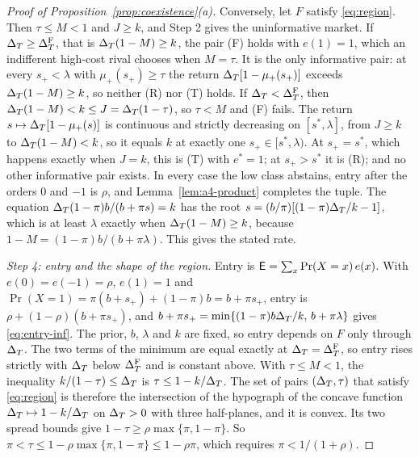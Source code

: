 \begin{proof}[Proof of Proposition~\ref{prop:coexistence}(a)]
Conversely, let \(F\) satisfy \eqref{eq:region}. Then \(\tau\le M<1\) and \(J\ge k\), and Step 2 gives the uninformative
market. If \(\Delta_T\ge\Delta_T^{\rm F}\), that is \(\Delta_T(1-M)\ge k\), the pair (F) holds with \(e(1)=1\), which an indifferent
high-cost rival chooses when \(M=\tau\). It is the only informative pair: at every \(s_+<\lambda\) with
\(\mu_+(s_+)\ge\tau\) the return \(\Delta_T[1-\mu_+(s_+)]\) exceeds \(\Delta_T(1-M)\ge k\), so neither (R) nor (T) holds. If
\(\Delta_T<\Delta_T^{\rm F}\), then \(\Delta_T(1-M)<k\le J=\Delta_T(1-\tau)\), so \(\tau<M\) and (F) fails. The return
\(s\mapsto\Delta_T[1-\mu_+(s)]\) is continuous and strictly decreasing on \([s^*,\lambda]\), from \(J\ge k\) to
\(\Delta_T(1-M)<k\), so it equals \(k\) at exactly one \(s_+\in[s^*,\lambda)\). At \(s_+=s^*\), which happens exactly when
\(J=k\), this is (T) with \(e^*=1\); at \(s_+>s^*\) it is (R); and no other informative pair exists. In every case the
low class abstains, entry after the orders \(0\) and \(-1\) is \(\rho\), and Lemma~\ref{lem:a4-product} completes the
tuple. The equation \(\Delta_T(1-\pi)b/(b+\pi s)=k\) has the root \(s=(b/\pi)[(1-\pi)\Delta_T/k-1]\), which is at least
\(\lambda\) exactly when \(\Delta_T(1-M)\ge k\), because \(1-M=(1-\pi)b/(b+\pi\lambda)\). This gives the stated rate.

\emph{Step 4: entry and the shape of the region.} Entry is \(\mathsf{E}=\sum_x\Pr(X=x)\,e(x)\). With \(e(0)=e(-1)=\rho\),
\(e(1)=1\) and \(\Pr(X=1)=\pi(b+s_+)+(1-\pi)b=b+\pi s_+\), entry is \(\rho+(1-\rho)(b+\pi s_+)\), and
\(b+\pi s_+=\min\{(1-\pi)b\Delta_T/k,\,b+\pi\lambda\}\) gives \eqref{eq:entry-inf}. The prior, \(b\), \(\lambda\) and \(k\)
are fixed, so entry depends on \(F\) only through \(\Delta_T\). The two terms of the minimum are equal exactly at
\(\Delta_T=\Delta_T^{\rm F}\), so entry rises strictly with \(\Delta_T\) below \(\Delta_T^{\rm F}\) and is constant above. With
\(\tau\le M<1\), the inequality \(k/(1-\tau)\le\Delta_T\) is \(\tau\le1-k/\Delta_T\). The set of pairs \((\Delta_T,\tau)\) that satisfy
\eqref{eq:region} is therefore the intersection of the hypograph of the concave function \(\Delta_T\mapsto1-k/\Delta_T\) on
\(\Delta_T>0\) with three half-planes, and it is convex. Its two spread bounds give \(1-\tau\ge\rho\max\{\pi,1-\pi\}\). So
\(\pi<\tau\le1-\rho\max\{\pi,1-\pi\}\le1-\rho\pi\), which requires \(\pi<1/(1+\rho)\).
\end{proof}

